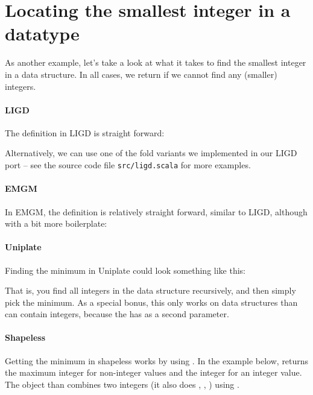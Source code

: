 \section{Locating the smallest integer in a datatype}
As another example, let's take a look at what it takes to find the smallest
integer in a data structure. In all cases, we return  if we cannot
find any (smaller) integers.

\paragraph{LIGD} The definition in LIGD is straight forward:


Alternatively, we can use one of the fold variants we implemented in our LIGD
port -- see the source code file \texttt{src/ligd.scala} for more examples.

\paragraph{EMGM} In EMGM, the definition is relatively straight forward, similar
to LIGD, although with a bit more boilerplate:



\paragraph{Uniplate}

Finding the minimum in Uniplate could look something like this:



That is, you find all integers in the data structure recursively, and then
simply pick the minimum. As a special bonus, this only works on data structures
than can contain integers, because the  has  as a second
parameter.
\paragraph{Shapeless}
Getting the minimum in shapeless works by using . In the example
below,  returns the maximum integer for non-integer values and the
integer for an integer value. The  object than combines two integers
(it also does , , ) using .

